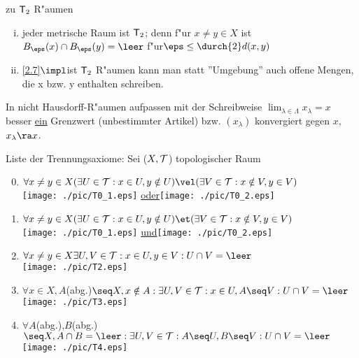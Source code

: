 \begin{bem}\label{3.15} zu $\mbox{\sf T}_2$ R"aumen
\begin{enumerate}[(i)]
\item jeder metrische Raum ist $\mbox{\sf T}_2$; denn f"ur $x\neq y\in X$ ist $B_\eps (x)\cap B_\eps (y) =\leer$ f"ur$ \eps\leq\durch{2} d(x,y)$
\item \ref{2.7}$\impl$ist $\mbox{\sf T}_2$ R"aumen kann man statt ''Umgebung'' auch offene Mengen, die x bzw. y enthalten schreiben.
\end{enumerate}
\end{bem}
In nicht {\sc Hausdorff}-R"aumen aufpassen mit der Schreibweise $\lim_{\lambda\in\Lambda}x_\lambda = x$ besser \ul{ein} Grenzwert (unbestimmter Artikel) bzw. $(x_\lambda )$ konvergiert gegen $x$, $x_\lambda\ra x$.
\begin{definition}\label{3.16}Liste der Trennungsaxiome:
Sei ($X,\mathcal T$) topologischer Raum
\begin{enumerate}[$\trax_1$]\setcounter{enumi}{-1}
\item $\forall x\neq y\in X(\exists U\in\T :x\in U,y\notin U)\vel (\exists V\in\T :x\notin V,y\in V)$\\
\texttt{[image: ./pic/T0\_1.eps]} \ul{\sc oder}\texttt{[image: ./pic/T0\_2.eps]}
\item $\forall x\neq y\in X(\exists U\in\T :x\in U,y\notin U)\et (\exists V\in\T :x\notin V,y\in V)$\\
\texttt{[image: ./pic/T0\_1.eps]} \ul{\sc und}\texttt{[image: ./pic/T0\_2.eps]}
\item $\forall x\neq y\in X\exists U,V\in\T :x\in U,y\in V:U\cap V=\leer$\\
\texttt{[image: ./pic/T2.eps]}
\item $\forall x\in X, A$(abg.)$\seq X, x\notin A:\exists U,V\in\T :x\in U,A\seq V:U\cap V=\leer$\\
\texttt{[image: ./pic/T3.eps]}
\item $\forall A$(abg.),$B$(abg.)$\seq X, A\cap B=\leer :\exists U,V\in\T :A\seq U, B\seq V:U\cap V=\leer$\\
\texttt{[image: ./pic/T4.eps]}
\end{enumerate}
\end{definition}
\newpage
